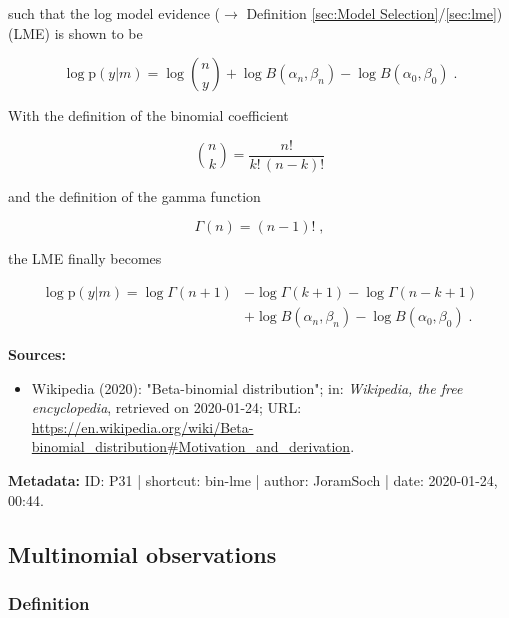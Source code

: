 \documentclass[a4paper,12pt,twoside]{book}
\begin{document}
such that the log model evidence ($\rightarrow$ Definition \ref{sec:Model Selection}/\ref{sec:lme}) (LME) is shown to be

\begin{equation} \label{eq:bin-lme-Bin-LME-s1}
\log \mathrm{p}(y|m) = \log {n \choose y} + \log B(\alpha_n,\beta_n) - \log B(\alpha_0,\beta_0) \; .
\end{equation}

With the definition of the binomial coefficient

\begin{equation} \label{eq:bin-lme-bin-coeff}
{n \choose k} = \frac{n!}{k! \, (n-k)!}
\end{equation}

and the definition of the gamma function

\begin{equation} \label{eq:bin-lme-gam-fct}
\Gamma(n) = (n-1)! \; ,
\end{equation}

the LME finally becomes

\begin{equation} \label{eq:bin-lme-Bin-LME-s2}
\begin{split}
\log \mathrm{p}(y|m) = \log \Gamma(n+1) &- \log \Gamma(k+1) - \log \Gamma(n-k+1) \\
&+ \log B(\alpha_n,\beta_n) - \log B(\alpha_0,\beta_0) \; .
\end{split}
\end{equation}


\vspace{1em}
\textbf{Sources:}
\begin{itemize}
\item Wikipedia (2020): "Beta-binomial distribution"; in: \textit{Wikipedia, the free encyclopedia}, retrieved on 2020-01-24; URL: \url{https://en.wikipedia.org/wiki/Beta-binomial_distribution#Motivation_and_derivation}.
\end{itemize}


\vspace{1em}
\textbf{Metadata:} ID: P31 | shortcut: bin-lme | author: JoramSoch | date: 2020-01-24, 00:44.
\vspace{1em}



\subsection{Multinomial observations}

\subsubsection[\textit{Definition}]{Definition} \label{sec:mult-data}
\setcounter{equation}{0}
\end{document}
